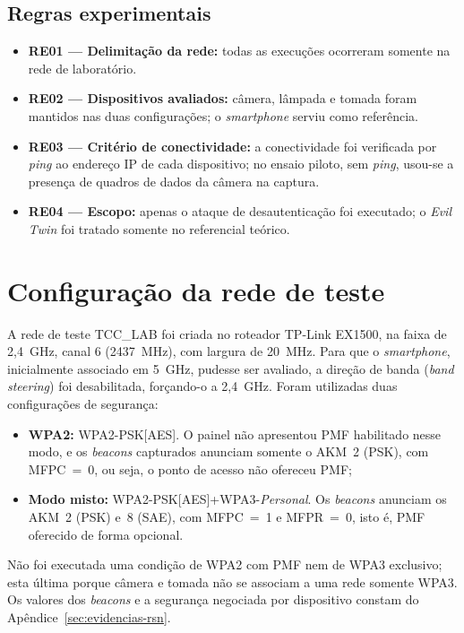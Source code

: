 \subsection{Regras experimentais}
\label{sec:regras_experimentais}

\begin{itemize}
    \item \textbf{RE01 --- Delimitação da rede:} todas as execuções ocorreram somente na rede de laboratório.
    \item \textbf{RE02 --- Dispositivos avaliados:} câmera, lâmpada e tomada foram mantidos nas duas configurações; o \textit{smartphone} serviu como referência.
    \item \textbf{RE03 --- Critério de conectividade:} a conectividade foi verificada por \textit{ping} ao endereço IP de cada dispositivo; no ensaio piloto, sem \textit{ping}, usou-se a presença de quadros de dados da câmera na captura.
    \item \textbf{RE04 --- Escopo:} apenas o ataque de desautenticação foi executado; o \textit{Evil Twin} foi tratado somente no referencial teórico.
\end{itemize}

\section{Configuração da rede de teste}
\label{sec:configuracao_rede_teste}

A rede de teste TCC\_LAB foi criada no roteador TP-Link EX1500, na faixa de 2,4~GHz, canal 6 (2437~MHz), com largura de 20~MHz. Para que o \textit{smartphone}, inicialmente associado em 5~GHz, pudesse ser avaliado, a direção de banda (\textit{band steering}) foi desabilitada, forçando-o a 2,4~GHz. Foram utilizadas duas configurações de segurança:

\begin{itemize}
    \item \textbf{WPA2:} WPA2-PSK[AES]. O painel não apresentou PMF habilitado nesse modo, e os \textit{beacons} capturados anunciam somente o AKM~2 (PSK), com MFPC~=~0, ou seja, o ponto de acesso não ofereceu PMF;
    \item \textbf{Modo misto:} WPA2-PSK[AES]+WPA3-\textit{Personal}. Os \textit{beacons} anunciam os AKM~2 (PSK) e~8 (SAE), com MFPC~=~1 e MFPR~=~0, isto é, PMF oferecido de forma opcional.
\end{itemize}

Não foi executada uma condição de WPA2 com PMF nem de WPA3 exclusivo; esta última porque câmera e tomada não se associam a uma rede somente WPA3. Os valores dos \textit{beacons} e a segurança negociada por dispositivo constam do Apêndice~\ref{sec:evidencias-rsn}.


